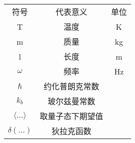 
\begin{table}[H]
\begin{center}
\begin{tabular}{ccc}
  \hline
  符号          & 代表意义     & 单位  \\
  T   & 温度     & K \\
  m   & 质量     & kg \\
  l   & 长度     & m \\
  $\omega$   & 频率     & Hz \\
  $\hbar$   & 约化普朗克常数     &  \\
  $k_b$  & 玻尔兹曼常数     &  \\
  $\langle\dots\rangle$   & 取量子态下期望值     & \\
  $\delta(\dots)$   & 狄拉克函数     & \\ \hline
\end{tabular}
\end{center}

\end{table}
